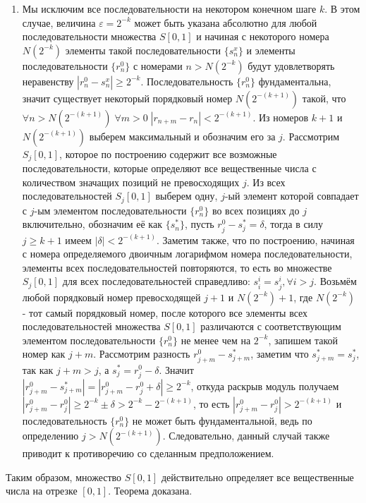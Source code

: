 \documentclass[12pt]{article}
\begin{document}
\begin{enumerate}
    \item Мы исключим все последовательности на некотором конечном шаге $k$. В этом случае, величина $\varepsilon = 2^{-k}$ может быть указана абсолютно для любой последовательности множества $S[0, 1]$ и начиная с некоторого номера $N(2^{-k})$ элементы такой последовательности $\{s^x_n\}$ и элементы последовательности $\{r^0_n\}$ с номерами $n > N(2^{-k})$ будут удовлетворять неравенству $|r^0_n - s^x_n| \geq 2^{-k}$. Последовательность  $\{r^0_n\}$ фундаментальна, значит существует некоторый порядковый номер $N(2^{- (k + 1)})$ такой, что $\forall n > N(2^{- (k + 1)}) \; \forall m > 0 \; |r_{n + m} - r_n| < 2^{- (k + 1)}$. Из номеров $k + 1$ и $N(2^{- (k + 1)})$ выберем максимальный и обозначим его за $j$. Рассмотрим $S_j[0, 1]$, которое по построению содержит все возможные последовательности, которые определяют все вещественные числа с количеством значащих позиций не превосходящих $j$. Из всех последовательностей $S_j[0, 1]$ выберем одну, $j$-ый элемент которой совпадает с $j$-ым элементом последовательности $\{r^0_n\}$ во всех позициях до $j$ включительно, обозначим её как $\{s^*_n\}$, пусть $r^0_j - s^*_j = \delta$, тогда в силу $j \geq k + 1$ имеем $|\delta| < 2^{- (k + 1)}$. Заметим также, что по построению, начиная с номера определяемого двоичным логарифмом номера последовательности, элементы всех последовательностей повторяются, то есть во множестве $S_j[0, 1]$ для всех последовательностей справедливо: $s^i_i = s^i_j, \forall i > j$. Возьмём любой порядковый номер превосходящей $j + 1$ и $N(2^{-k}) + 1$, где $N(2^{-k})$ - тот самый порядковый номер, после которого все элементы всех последовательностей множества $S[0, 1]$ различаются с соответствующим элементом последовательности $\{r^0_n\}$ не менее чем на $2^{-k}$, запишем такой номер как $j + m$. Рассмотрим разность $r^0_{j + m} - s^*_{j + m}$, заметим что $s^*_{j + m} = s^*_j$, так как $j + m > j$, а $s^*_j = r^0_j - \delta$. Значит $|r^0_{j + m} - s^*_{j + m}| = |r^0_{j + m} - r^0_j + \delta| \geq 2^{-k}$, откуда раскрыв модуль получаем $|r^0_{j + m} - r^0_j| \geq 2^{-k} \pm \delta > 2^{-k} - 2^{- (k + 1)}$, то есть $|r^0_{j + m} - r^0_j| > 2^{- (k + 1)}$ и последовательность $\{r^0_n\}$ не может быть фундаментальной, ведь по определению $j > N(2^{- (k + 1)})$. Следовательно, данный случай также приводит к противоречию со сделанным предположением.
\end{enumerate}

Таким образом, множество $S[0, 1]$ действительно определяет все вещественные числа на отрезке $[0, 1]$. Теорема доказана. 
\end{document}
